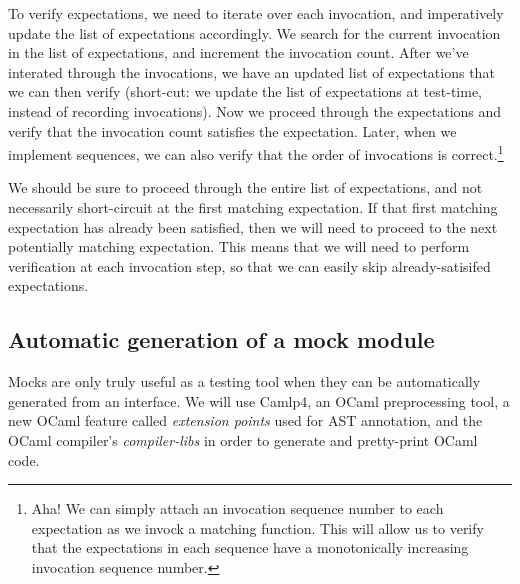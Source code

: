 To verify expectations, we need to iterate over each invocation, and
imperatively update the list of expectations accordingly. We search
for the current invocation in the list of expectations, and increment
the invocation count. After we've interated through the invocations,
we have an updated list of expectations that we can then verify
(short-cut: we update the list of expectations at test-time, instead
of recording invocations). Now we proceed through the expectations and
verify that the invocation count satisfies the expectation. Later,
when we implement sequences, we can also verify that the order of
invocations is correct.\footnote{Aha! We can simply attach an
  invocation sequence number to each expectation as we invock a
  matching function. This will allow us to verify that the
  expectations in each sequence have a monotonically increasing
  invocation sequence number.}

We should be sure to proceed through the entire list of expectations,
and not necessarily short-circuit at the first matching
expectation. If that first matching expectation has already been
satisfied, then we will need to proceed to the next potentially
matching expectation. This means that we will need to perform
verification at each invocation step, so that we can easily skip
already-satisifed expectations.

\subsection{Automatic generation of a mock module}
\label{application:generation}

Mocks are only truly useful as a testing tool when they can be
automatically generated from an interface. We will use Camlp4, an
OCaml preprocessing tool, a new OCaml feature called \textit{extension
  points} used for AST annotation, and the OCaml compiler's
\textit{compiler-libs} in order to generate and pretty-print OCaml
code.
